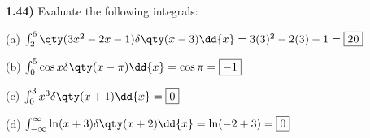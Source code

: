 \documentclass[12pt,a4paper]{article}
\newcommand{\prob}[2]{\textbf{#1)} #2}
\begin{document}
\prob{1.44}{Evaluate the following integrals:}

(a) $\int_{2}^{6} \qty(3x^2 - 2x - 1)\delta\qty(x-3)\dd{x} = 3(3)^2 - 2(3) - 1 = \boxed{20}$

(b) $\int_{0}^{5} \cos{x}\delta\qty(x-\pi)\dd{x} = \cos{\pi} = \boxed{-1}$

(c) $\int_{0}^{3} x^3\delta\qty(x+1)\dd{x} = \boxed{0}$

(d) $\int_{-\infty}^{\infty} \ln(x+3)\delta\qty(x+2)\dd{x} = \ln(-2 + 3) = \boxed{0}$
\end{document}
